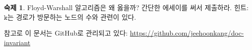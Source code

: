 \documentclass{oblivoir}
\theoremstyle{definition}
\newtheorem{homework}[exercise]{숙제}
\begin{document}
\begin{homework}
  Floyd-Warshall 알고리즘은 왜 옳을까?  간단한 에세이를 써서 제출하라.
  힌트: $\texttt{k}$는 경로가 방문하는 노드의 수와 관련이 있다.
\end{homework}

참고로 이 문서는 GitHub로 관리되고 있다:
\url{https://github.com/jeehoonkang/doc-invariant}



\end{document}
